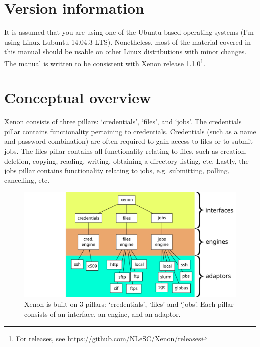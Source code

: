 \documentclass[12pt, a4paper, twoside, openany, titlepage]{book}
\begin{document}
\section{Version information}

It is assumed that you are using one of the Ubuntu-based operating systems (I'm using Linux Lubuntu 14.04.3 LTS). Nonetheless, most of the material covered in this manual should be usable on other Linux distributions with minor changes. The manual is written to be consistent with Xenon release 1.1.0\footnote{For releases, see \url{https://github.com/NLeSC/Xenon/releases}}.


\section{Conceptual overview}





Xenon consists of three pillars: `credentials', `files', and `jobs'.
%
The credentials pillar contains functionality pertaining to credentials. Credentials (such as a name and password combination) are often required to gain access to files or to submit jobs.
%
The files pillar contains all functionality relating to files, such as creation, deletion, copying, reading, writing, obtaining a directory listing, etc.
%
Lastly, the jobs pillar contains functionality relating to jobs, e.g. submitting, polling, cancelling, etc.


\begin{figure}[ht]
\centering
\includegraphics[width=1.0\columnwidth]{images/xenon-design}
\caption{\label{fig:xenon-design} Xenon is built on 3 pillars: `credentials', `files' and `jobs'. Each pillar consists of an interface, an engine, and an adaptor.}
\end{figure}
\end{document}
